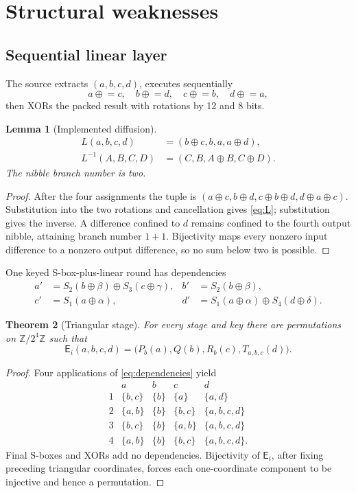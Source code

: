 \documentclass[10pt]{article}
\theoremstyle{plain}
\newtheorem{theorem}{Theorem}
\newtheorem{lemma}[theorem]{Lemma}
\theoremstyle{definition}
\theoremstyle{remark}
\newcommand{\Zb}[1]{\mathbb Z/2^{#1}\mathbb Z}
\newcommand{\xor}{\mathbin{\oplus}}
\newcommand{\E}{\mathsf E}
\begin{document}
\section{Structural weaknesses}
\label{sec:structure}

\subsection{Sequential linear layer}

The source extracts \((a,b,c,d)\), executes sequentially
\[
a\mathrel{\xor}=c,\quad b\mathrel{\xor}=d,\quad
c\mathrel{\xor}=b,\quad d\mathrel{\xor}=a,
\]
then XORs the packed result with rotations by 12 and 8 bits.

\begin{lemma}[Implemented diffusion]
\label{lem:linear}
\begin{align}
L(a,b,c,d)&=(b\xor c,b,a,a\xor d),\label{eq:L}\\
L^{-1}(A,B,C,D)&=(C,B,A\xor B,C\xor D).
\end{align}
The nibble branch number is two.
\end{lemma}
\begin{proof}
After the four assignments the tuple is
\((a\xor c,b\xor d,c\xor b\xor d,d\xor a\xor c)\).  Substitution into
the two rotations and cancellation gives \eqref{eq:L}; substitution gives the
inverse.  A difference confined to \(d\) remains confined to the fourth
output nibble, attaining branch number \(1+1\).  Bijectivity maps every
nonzero input difference to a nonzero output difference, so no sum below two
is possible.
\end{proof}

One keyed S-box-plus-linear round has dependencies
\begin{align}
a'&=S_2(b\xor\beta)\xor S_3(c\xor\gamma),&
b'&=S_2(b\xor\beta),\nonumber\\
c'&=S_1(a\xor\alpha),&
d'&=S_1(a\xor\alpha)\xor S_4(d\xor\delta).
\label{eq:dependencies}
\end{align}

\begin{theorem}[Triangular stage]
\label{thm:triangular}
For every stage and key there are permutations on \(\Zb4\) such that
\begin{equation}
\E_i(a,b,c,d)=\bigl(P_b(a),Q(b),R_b(c),T_{a,b,c}(d)\bigr).
\label{eq:triangular}
\end{equation}
\end{theorem}
\begin{proof}
Four applications of \eqref{eq:dependencies} yield
\[
\begin{array}{c|cccc}
 &a&b&c&d\\ \hline
1&\{b,c\}&\{b\}&\{a\}&\{a,d\}\\
2&\{a,b\}&\{b\}&\{b,c\}&\{a,b,c,d\}\\
3&\{b,c\}&\{b\}&\{a,b\}&\{a,b,c,d\}\\
4&\{a,b\}&\{b\}&\{b,c\}&\{a,b,c,d\}.
\end{array}
\]
Final S-boxes and XORs add no dependencies.  Bijectivity of \(\E_i\), after
fixing preceding triangular coordinates, forces each one-coordinate component
to be injective and hence a permutation.
\end{proof}
\end{document}
